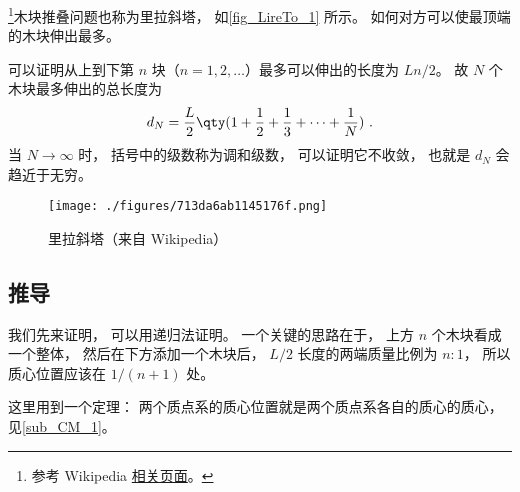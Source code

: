 
\begin{issues}
\issueDraft
\end{issues}


\footnote{参考 Wikipedia \href{https://en.wikipedia.org/wiki/Block-stacking_problem}{相关页面}。}木块推叠问题也称为里拉斜塔， 如\autoref{fig_LireTo_1} 所示。 如何对方可以使最顶端的木块伸出最多。

可以证明从上到下第 $n$ 块（$n=1,2,\dots$）最多可以伸出的长度为 $Ln/2$。 故 $N$ 个木块最多伸出的总长度为
\begin{equation}
d_N = \frac{L}{2}\qty(1 + \frac{1}{2} + \frac{1}{3} + \dots + \frac{1}{N})~.
\end{equation}
当 $N\to\infty$ 时， 括号中的级数称为调和级数，%
可以证明它不收敛， 也就是 $d_N$ 会趋近于无穷。

\begin{figure}[ht]
\centering
\texttt{[image: ./figures/713da6ab1145176f.png]}
\caption{里拉斜塔（来自 Wikipedia）} \label{fig_LireTo_1}
\end{figure}

\subsection{推导}
我们先来证明，   可以用递归法证明。  一个关键的思路在于， 上方 $n$ 个木块看成一个整体， 然后在下方添加一个木块后， $L/2$ 长度的两端质量比例为 $n:1$， 所以质心位置应该在 $1/(n+1)$ 处。

这里用到一个定理： 两个质点系的质心位置就是两个质点系各自的质心的质心， 见\autoref{sub_CM_1}。


